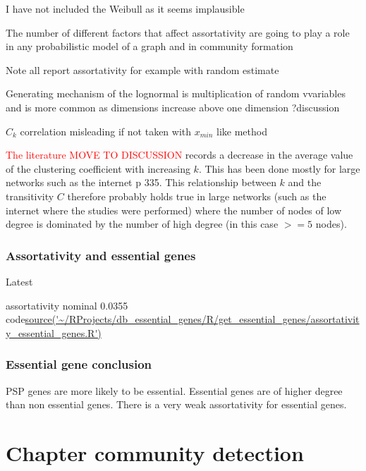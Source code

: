 I have not included the Weibull as it seems implausible

The number of different factors that affect assortativity are going to play a role in any probabilistic model of a graph and in community formation

Note all report assortativity for example with random estimate

Generating mechanism of the lognormal is multiplication of random vvariables and is more common as dimensions increase above one dimension \cite{} ?discussion \cite{koch1966logarithm}
\cite{limpert2001log}

$C_k$ correlation misleading if not taken with $x_{min}$ like method

\textcolor{red}{The literature MOVE TO DISCUSSION} records a decrease in the average value of the clustering coefficient with increasing $k$. This has been done mostly for large networks such as the internet \cite{newman2018networks} p 335.
This relationship between $k$ and the transitivity $C$ therefore probably holds true in large networks (such as the internet where the studies were performed) where the number of nodes of low degree is dominated by the number of high degree (in this case $>=5$ nodes). 

\subsubsection{Assortativity and essential genes}
\label{sec:Assortativity and essential genes}
Latest 

assortativity nominal 0.0355
code\url{source('~/RProjects/db_essential_genes/R/get_essential_genes/assortativity_essential_genes.R')}

\subsubsection{Essential gene conclusion}
PSP genes are more likely to be essential. Essential genes are of higher degree than non essential genes. There is a very weak assortativity for essential genes. 




\section{Chapter community detection}

